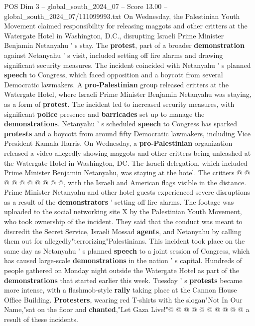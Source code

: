 \begin{textsample}{POS Dim 3 – global\_south\_2024\_07 – Score 13.00 – global\_south\_2024\_07/111099993.txt}  \label{ex:f3_pos_308}
On Wednesday, the Palestinian Youth Movement claimed responsibility for releasing maggots and other critters at the Watergate Hotel in Washington, D.C., disrupting Israeli Prime Minister Benjamin Netanyahu ' s stay.
The \textbf{protest}, part of a broader \textbf{demonstration} against Netanyahu ' s visit, included setting off fire alarms and drawing significant security measures.
The incident coincided with Netanyahu ' s planned \textbf{speech} to Congress, which faced opposition and a boycott from several Democratic lawmakers.
A \textbf{pro-Palestinian} group released critters at the Watergate Hotel, where Israeli Prime Minister Benjamin Netanyahu was staying, as a form of \textbf{protest}.
The incident led to increased security measures, with significant \textbf{police} presence and \textbf{barricades} set up to manage the \textbf{demonstrations}.
Netanyahu ' s scheduled \textbf{speech} to Congress has sparked \textbf{protests} and a boycott from around fifty Democratic lawmakers, including Vice President Kamala Harris.
On Wednesday, a \textbf{pro-Palestinian} organization released a video allegedly showing maggots and other critters being unleashed at the Watergate Hotel in Washington, DC.
The Israeli delegation, which included Prime Minister Benjamin Netanyahu, was staying at the hotel.
The critters @ @ @ @ @ @ @ @ @ @, with the Israeli and American flags visible in the distance.
Prime Minister Netanyahu and other hotel guests experienced severe disruptions as a result of the \textbf{demonstrators} ' setting off fire alarms.
The footage was uploaded to the social networking site X by the Palestinian Youth Movement, who took ownership of the incident.
They said that the conduct was meant to discredit the Secret Service, Israeli Mossad \textbf{agents}, and Netanyahu by calling them out for allegedly"terrorizing"Palestinians.
This incident took place on the same day as Netanyahu ' s planned \textbf{speech} to a joint session of Congress, which has caused large-scale \textbf{demonstrations} in the nation ' s capital.
Hundreds of people gathered on Monday night outside the Watergate Hotel as part of the \textbf{demonstrations} that started earlier this week.
Tuesday ' s \textbf{protests} became more intense, with a flashmob-style \textbf{rally} taking place at the Cannon House Office Building. \textbf{Protesters}, wearing red T-shirts with the slogan"Not In Our Name,"sat on the floor and \textbf{chanted},"Let Gaza Live!"@ @ @ @ @ @ @ @ @ @ a result of these incidents.

\end{textsample}
